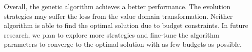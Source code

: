 \documentclass{article}
\begin{document}
Overall, the genetic algorithm achieves a better performance. The evolution strategies may suffer the loss from the value domain transformation. Neither algorithm is able to find the optimal solution due to budget constraints. In future research, we plan to explore more strategies and fine-tune the algorithm parameters to converge to the optimal solution with as few budgets as possible.


  
  
\end{document}
